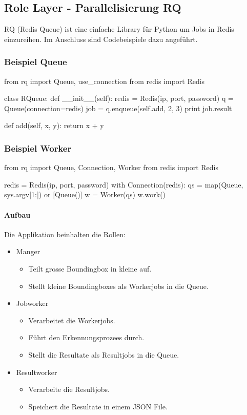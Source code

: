 
\subsection{Role Layer - Parallelisierung RQ}

\Gls{RQ} \cite{RQ} (Redis Queue) ist eine einfache Library für Python um Jobs in Redis einzureihen. Im Anschluss sind Codebeispiele dazu angeführt.

\subsubsection{Beispiel Queue}
\begin{python}
from rq import Queue, use_connection
from redis import Redis

class RQueue:
   def __init__(self):
       redis = Redis(ip, port, password)
       q = Queue(connection=redis)
       job = q.enqueue(self.add, 2, 3)
       print job.result

   def add(self, x, y):
       return x + y
\end{python}

\subsubsection{Beispiel Worker}
\begin{python}
from rq import Queue, Connection, Worker
from redis import Redis

redis = Redis(ip, port, password)
with Connection(redis):
   qs = map(Queue, sys.argv[1:]) or [Queue()]
   w = Worker(qs)
   w.work()
\end{python}

\paragraph{Aufbau} Die Applikation beinhalten die Rollen:
\begin{itemize}
	\item Manger
	\begin{itemize}
		\item Teilt grosse Boundingbox in kleine auf.
		\item Stellt kleine Boundingboxes als Workerjobs in die Queue.
	\end{itemize}
		\item Jobworker
	\begin{itemize}
		\item Verarbeitet die Workerjobs.
		\item Führt den Erkennungsprozees durch.
		\item Stellt die Resultate als Resultjobs in die Queue.
	\end{itemize}
		\item Resultworker
	\begin{itemize}
		\item Verarbeite die Resultjobs.
		\item Speichert die Resultate in einem JSON File.
	\end{itemize}
\end{itemize}


\newpage
